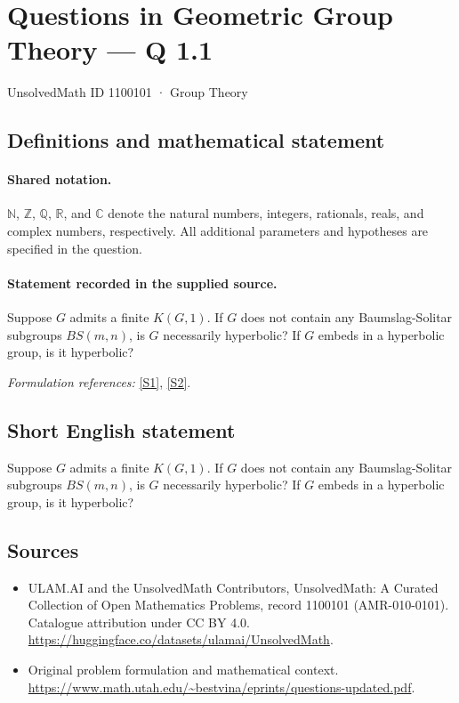 \documentclass[11pt]{article}
\newcommand{\sref}[2]{\hyperlink{source:#1:#2}{[S#2]}}
\begin{document}
\setcounter{section}{1100100}
\section{Questions in Geometric Group Theory — Q 1.1}\label{1100101}
{\small UnsolvedMath ID 1100101 · Group Theory}
\subsection{Definitions and mathematical statement}

\paragraph{Shared notation.}$\mathbb N$, $\mathbb Z$, $\mathbb Q$, $\mathbb R$, and $\mathbb C$ denote the natural numbers, integers, rationals, reals, and complex numbers, respectively. All additional parameters and hypotheses are specified in the question.


\paragraph{Statement recorded in the supplied source.}
Suppose $G$ admits a finite $K(G,1)$. If $G$ does not contain any Baumslag-Solitar subgroups $BS(m,n)$, is $G$ necessarily hyperbolic? If $G$ embeds in a hyperbolic group, is it hyperbolic?
\par\smallskip\textit{Formulation references:} \sref{1100101}{1}, \sref{1100101}{2}.
\subsection{Short English statement}
Suppose $G$ admits a finite $K(G,1)$. If $G$ does not contain any Baumslag-Solitar subgroups $BS(m,n)$, is $G$ necessarily hyperbolic? If $G$ embeds in a hyperbolic group, is it hyperbolic?
\subsection{Sources}
\begin{itemize}
\item[\hypertarget{source:1100101:1}{S1}] ULAM.AI and the UnsolvedMath Contributors, UnsolvedMath: A Curated Collection of Open Mathematics Problems, record 1100101 (AMR-010-0101). Catalogue attribution under CC BY 4.0.
\url{https://huggingface.co/datasets/ulamai/UnsolvedMath}.
\item[\hypertarget{source:1100101:2}{S2}] Original problem formulation and mathematical context.
\url{https://www.math.utah.edu/~bestvina/eprints/questions-updated.pdf}.
\end{itemize}
\label{end:1100101}
\end{document}
